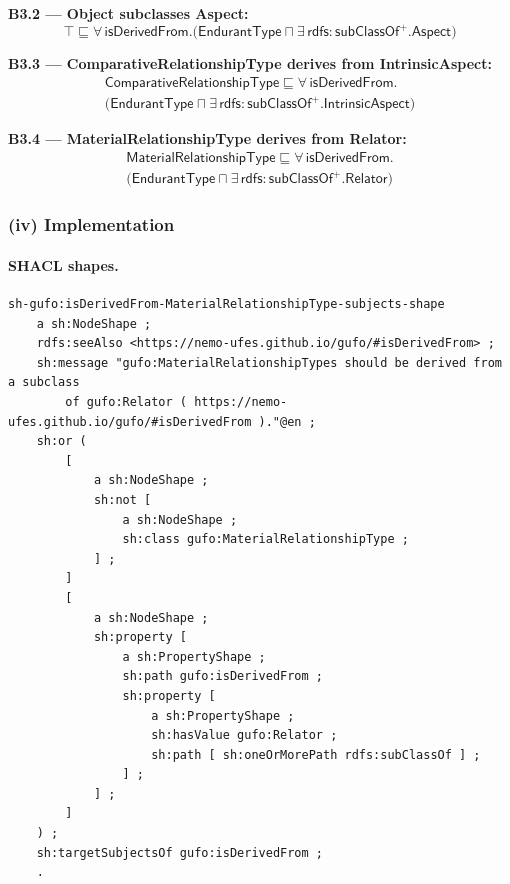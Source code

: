 \documentclass[12pt,a4paper]{article}
\begin{document}
\textbf{B3.2 --- Object subclasses Aspect:}
\begin{equation*}
  \top \sqsubseteq \forall\,\mathsf{isDerivedFrom}.
  \bigl(\mathsf{EndurantType} \sqcap \exists\,\mathsf{rdfs{:}subClassOf}^{+}.\mathsf{Aspect}\bigr)
\end{equation*}

\textbf{B3.3 --- ComparativeRelationshipType derives from IntrinsicAspect:}
\begin{multline*}
  \mathsf{ComparativeRelationshipType} \sqsubseteq \forall\,\mathsf{isDerivedFrom}.\\
  \bigl(\mathsf{EndurantType} \sqcap \exists\,\mathsf{rdfs{:}subClassOf}^{+}.\mathsf{IntrinsicAspect}\bigr)
\end{multline*}

\textbf{B3.4 --- MaterialRelationshipType derives from Relator:}
\begin{multline*}
  \mathsf{MaterialRelationshipType} \sqsubseteq \forall\,\mathsf{isDerivedFrom}.\\
  \bigl(\mathsf{EndurantType} \sqcap \exists\,\mathsf{rdfs{:}subClassOf}^{+}.\mathsf{Relator}\bigr)
\end{multline*}

\subsubsection*{(iv) Implementation}

\paragraph{SHACL shapes.}

\begin{lstlisting}[style=turtlestyle]
sh-gufo:isDerivedFrom-MaterialRelationshipType-subjects-shape
    a sh:NodeShape ;
    rdfs:seeAlso <https://nemo-ufes.github.io/gufo/#isDerivedFrom> ;
    sh:message "gufo:MaterialRelationshipTypes should be derived from a subclass
        of gufo:Relator ( https://nemo-ufes.github.io/gufo/#isDerivedFrom )."@en ;
    sh:or (
        [
            a sh:NodeShape ;
            sh:not [
                a sh:NodeShape ;
                sh:class gufo:MaterialRelationshipType ;
            ] ;
        ]
        [
            a sh:NodeShape ;
            sh:property [
                a sh:PropertyShape ;
                sh:path gufo:isDerivedFrom ;
                sh:property [
                    a sh:PropertyShape ;
                    sh:hasValue gufo:Relator ;
                    sh:path [ sh:oneOrMorePath rdfs:subClassOf ] ;
                ] ;
            ] ;
        ]
    ) ;
    sh:targetSubjectsOf gufo:isDerivedFrom ;
    .
\end{lstlisting}
\end{document}
